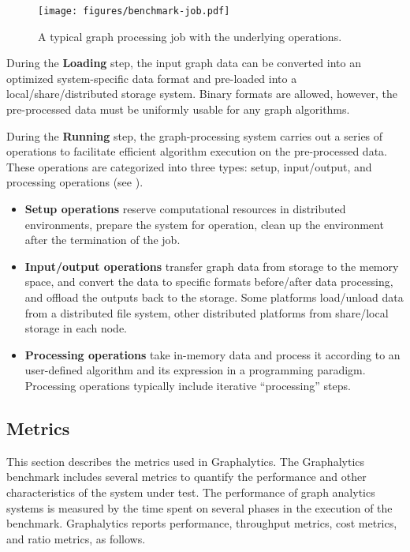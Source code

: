 \begin{figure}[h]
	\centering
	\texttt{[image: figures/benchmark-job.pdf]}
	\caption{A typical graph processing job with the underlying operations.}
	\label{fig:job}
\end{figure}


During the \textbf{Loading} step, the input graph data can be converted into an optimized system-specific data format and pre-loaded into a local/share/distributed storage system. Binary formats are allowed, however, the pre-processed data must be uniformly usable for any graph algorithms. 

During the \textbf{Running} step, the graph-processing system carries out a series of operations to facilitate efficient algorithm execution on the pre-processed data. These operations are categorized into three types: setup, input/output, and processing operations (see ).
\begin{itemize}
    \item \textbf{Setup operations} reserve computational resources in distributed environments, prepare the system for operation, clean up the environment after the termination of the job.
    \item \textbf{Input/output operations} transfer graph data from storage to the memory space, and convert the data to specific formats before/after data processing, and offload the outputs back to the storage. Some platforms load/unload data from a distributed file system, other distributed platforms from share/local storage in each node. 
    \item \textbf{Processing operations} take in-memory data and process it according to an user-defined algorithm and its expression in a programming paradigm. Processing operations typically include iterative ``processing'' steps.
\end{itemize}








\subsection{Metrics} 
\label{sec:def:metrics}
This section describes the metrics used in Graphalytics. The Graphalytics benchmark includes several metrics to quantify the performance and other characteristics of the system under test. The performance of graph analytics systems is measured by the time spent on several phases in the execution of the benchmark. Graphalytics reports performance, throughput metrics, cost metrics, and ratio metrics, as follows.




